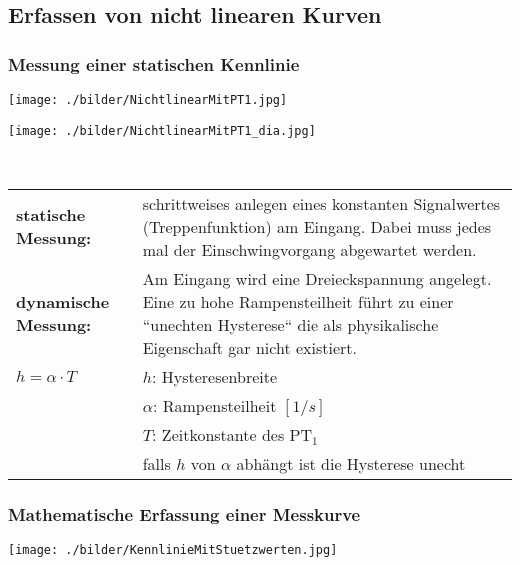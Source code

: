	\subsection{Erfassen von nicht linearen Kurven}
	\subsubsection{Messung einer statischen Kennlinie}
	\begin{minipage}{10cm}
		\texttt{[image: ./bilder/NichtlinearMitPT1.jpg]}   
    \end{minipage}
	\begin{minipage}{7cm}
    	\texttt{[image: ./bilder/NichtlinearMitPT1\_dia.jpg]}
    \end{minipage}\\
		
		\begin{tabular}{p{4cm}  p{12cm}}
				\textbf{statische Messung:} &
				schrittweises anlegen eines konstanten Signalwertes (Treppenfunktion)
				am Eingang. Dabei muss jedes mal der Einschwingvorgang abgewartet werden.\\
				
				\textbf{dynamische Messung:} &
				Am Eingang wird eine Dreieckspannung angelegt. Eine zu hohe Rampensteilheit
				führt zu einer ``unechten Hysterese`` die als physikalische Eigenschaft gar
				nicht existiert.\\
		
				$h = \alpha \cdot T$ & $h$: Hysteresenbreite\\
				& $\alpha$: Rampensteilheit $[1/s]$\\
				& $T$: Zeitkonstante des PT$_1$\\
				& falls $h$ von $\alpha$ abhängt ist die Hysterese unecht
			
		\end{tabular}
	
	\subsubsection{Mathematische Erfassung einer Messkurve}

	\begin{floatingfigure}[r]{12cm}
    \texttt{[image: ./bilder/KennlinieMitStuetzwerten.jpg]}
	\end{floatingfigure}
   	
